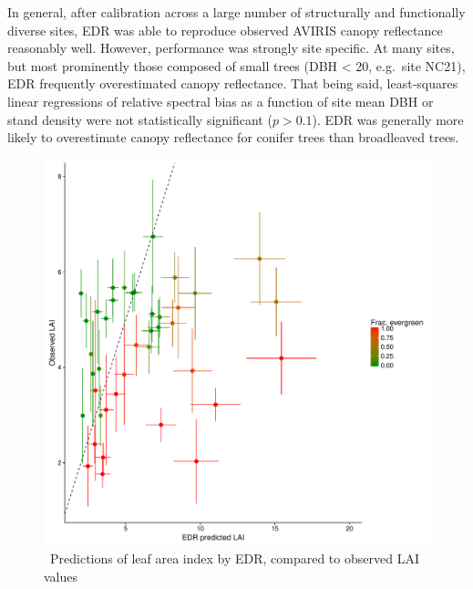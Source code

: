 In general, after calibration across a large number of structurally and functionally diverse sites, EDR was able to reproduce observed AVIRIS canopy reflectance reasonably well.
However, performance was strongly site specific.
At many sites, but most prominently those composed of small trees (DBH < 20, e.g.\ site NC21), EDR frequently overestimated canopy reflectance.
That being said, least-squares linear regressions of relative spectral bias as a function of site mean DBH or stand density were not statistically significant ($p > 0.1$).
EDR was generally more likely to overestimate canopy reflectance for conifer trees than broadleaved trees.

\begin{figure}
  \centering
  \includegraphics[width=\textwidth]{figures/lai_sites.pdf}
  \caption{\
    Predictions of leaf area index by EDR, compared to observed LAI values
  }\label{fig:lai_validation}
% 
% 
% 
\end{figure}

